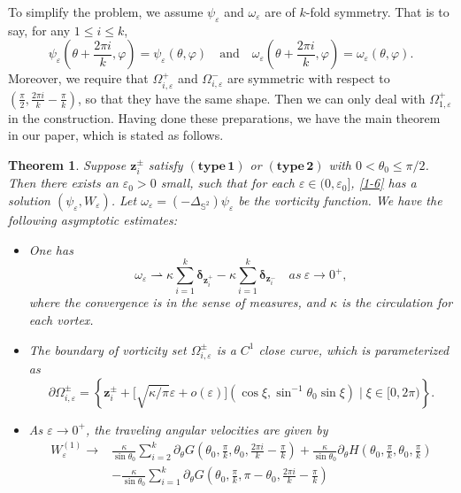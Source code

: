 \documentclass[12pt,reqno]{amsart}
\numberwithin{equation}{section}
\newtheorem{theorem}{Theorem}[section]
\theoremstyle{definition}
\theoremstyle{remark}
\begin{document}
   To simplify the problem, we assume $\psi_\varepsilon$ and $\omega_\varepsilon$ are of $k$-fold symmetry. That is to say, for any $1\leq i \leq k$,
   $$\psi_\varepsilon\left(\theta+\frac{2\pi i}{k},\varphi\right)=\psi_\varepsilon(\theta,\varphi) \quad \mathrm{and} \quad \omega_\varepsilon\left(\theta+\frac{2\pi i}{k},\varphi\right)=\omega_\varepsilon(\theta,\varphi).$$
   Moreover, we require that $\Omega_{i,\varepsilon}^+$ and $\Omega_{i,\varepsilon}^-$ are symmetric with respect to $(\frac{\pi}{2},\frac{2\pi i}{k}-\frac{\pi}{k})$, 
   so that they have the same shape. Then we can only deal with $\Omega_{1,\varepsilon}^+$ in the construction. Having done these preparations, 
   we have the main theorem in our paper, which is stated as follows.
    \begin{theorem}\label{thm1}
   	Suppose $\boldsymbol z_i^\pm$ satisfy $\mathbf{(type\, 1)}$ or $\mathbf{(type\, 2)}$ with $0<\theta_0\le\pi/2$. Then there exists an $\varepsilon_0>0$ small, such that for each $\varepsilon\in (0,\varepsilon_0]$, \eqref{1-6} has a solution $(\psi_\varepsilon, W_\varepsilon)$. Let $\omega_\varepsilon=(-\Delta_{\mathbb S^2})\psi_\varepsilon$ be the vorticity function. We have the following asymptotic estimates:
   	\begin{itemize}
   		\item[(i)] One has
   		$$\omega_\varepsilon\rightharpoonup \kappa\sum\limits_{i=1}^{k}\boldsymbol \delta_{\boldsymbol z_i^+}-\kappa\sum\limits_{i=1}^{k}\boldsymbol \delta_{\boldsymbol z_i^-} \quad as \ \varepsilon\to 0^+,$$
   		where the convergence is in the sense of measures, and $\kappa$ is the circulation for each vortex.
   		\item[(ii)] The boundary of vorticity set $\Omega_{i,\varepsilon}^\pm$ is a $C^1$ close curve, which is parameterized as
   		$$\partial \Omega_{i,\varepsilon}^\pm=\left\{\boldsymbol z_i^\pm+\big[\sqrt{\kappa/\pi}\varepsilon+o(\varepsilon)\big](\cos\xi,\sin^{-1}\theta_0\sin\xi) \mid \xi\in[0, 2\pi) \right\}.$$
   		\item[(iii)] As $\varepsilon\to 0^+$, the traveling angular velocities are given by
   		\begin{align*}
   			W_\varepsilon^{(1)}\to&\frac{\kappa}{\sin\theta_0}\sum\limits_{i=2}^k\partial_\theta G\left(\theta_0,\frac{\pi}{k},\theta_0,\frac{2\pi i}{k}-\frac{\pi}{k}\right)+\frac{\kappa}{\sin\theta_0}\partial_\theta H\left(\theta_0,\frac{\pi}{k},\theta_0,\frac{\pi }{k}\right)\\
   			&-\frac{\kappa}{\sin\theta_0}\sum\limits_{i=1}^k\partial_\theta G\left(\theta_0,\frac{\pi}{k},\pi-\theta_0,\frac{2\pi i}{k}-\frac{\pi}{k}\right)

\end{align*}
\end{itemize}
\end{theorem}
\end{document}
